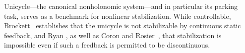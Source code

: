 \documentclass[journal,twoside,web]{ieeecolor}
\theoremstyle{definition}
\begin{document}



Unicycle---the canonical nonholonomic system---and in particular its parking task, serves as a benchmark for nonlinear stabilization.
While controllable, Brockett~\cite{brockett1983asymptotic} establishes that the unicycle is not stabilizable by continuous static feedback, and Ryan \cite{ryan1994brockett}, as well as Coron and Rosier~\cite{coron1994relation}, that stabilization is impossible even if such a feedback is permitted to be discontinuous. %
\end{document}
